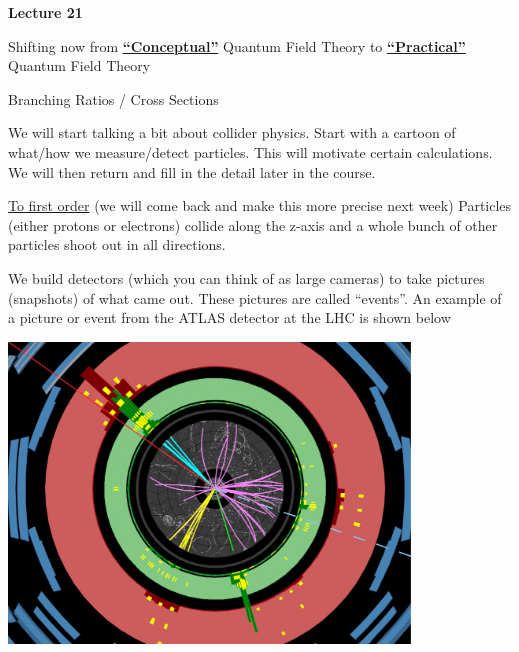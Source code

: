 
\usepackage{braket}
\usepackage{bbm}
\usepackage{relsize}
\usepackage{tcolorbox}




\usepackage{fancyhdr}

\fancyhf{}


\thispagestyle{fancy}

\begin{center}
{\huge \textbf{Lecture 21}}
\end{center}

{\fontsize{14}{16}\selectfont

Shifting now from \underline{\textbf{``Conceptual''}} Quantum Field Theory to \underline{\textbf{``Practical''}} Quantum Field Theory

{\Large Branching Ratios / Cross Sections}

We will start talking a bit about collider physics. 
Start with a cartoon of what/how we measure/detect particles.
This will motivate certain calculations.  
We will then return and fill in the detail later in the course.


\underline{To first order}  (we will come back and make this more precise next week)
Particles (either protons or electrons) collide along the z-axis and a whole bunch of other particles shoot out in all directions.   

We build detectors (which you can think of as large cameras) to take pictures (snapshots) of what came out. 
These pictures are called ``events''.
An example of a picture or event from the ATLAS detector at the LHC is shown below

\bc
\includegraphics[width=0.8\textwidth]{./EventDisplayNoLabel.pdf}
\ec

}
